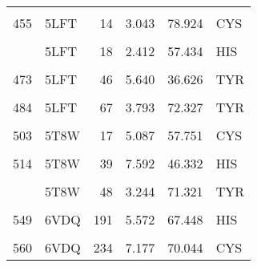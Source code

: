 \begin{table}
\begin{tabular}{llrrrl}
			\cellcolor{gray!6}{437} & \cellcolor{gray!6}{5KPF} & \cellcolor{gray!6}{67} & \cellcolor{gray!6}{3.864} & \cellcolor{gray!6}{73.698} & \cellcolor{gray!6}{TYR}\\
			455 & 5LFT & 14 & 3.043 & 78.924 & CYS\\
			\cellcolor{gray!6}{458} & \cellcolor{gray!6}{5LFT} & \cellcolor{gray!6}{17} & \cellcolor{gray!6}{5.110} & \cellcolor{gray!6}{55.965} & \cellcolor{gray!6}{CYS}\\
			\addlinespace
			459 & 5LFT & 18 & 2.412 & 57.434 & HIS\\
			\cellcolor{gray!6}{468} & \cellcolor{gray!6}{5LFT} & \cellcolor{gray!6}{39} & \cellcolor{gray!6}{7.158} & \cellcolor{gray!6}{48.215} & \cellcolor{gray!6}{HIS}\\
			473 & 5LFT & 46 & 5.640 & 36.626 & TYR\\
			\cellcolor{gray!6}{475} & \cellcolor{gray!6}{5LFT} & \cellcolor{gray!6}{48} & \cellcolor{gray!6}{3.281} & \cellcolor{gray!6}{71.142} & \cellcolor{gray!6}{TYR}\\
			484 & 5LFT & 67 & 3.793 & 72.327 & TYR\\
			\addlinespace
			\cellcolor{gray!6}{500} & \cellcolor{gray!6}{5T8W} & \cellcolor{gray!6}{14} & \cellcolor{gray!6}{3.051} & \cellcolor{gray!6}{80.130} & \cellcolor{gray!6}{CYS}\\
			503 & 5T8W & 17 & 5.087 & 57.751 & CYS\\
			\cellcolor{gray!6}{504} & \cellcolor{gray!6}{5T8W} & \cellcolor{gray!6}{18} & \cellcolor{gray!6}{2.411} & \cellcolor{gray!6}{56.673} & \cellcolor{gray!6}{HIS}\\
			514 & 5T8W & 39 & 7.592 & 46.332 & HIS\\
			\cellcolor{gray!6}{519} & \cellcolor{gray!6}{5T8W} & \cellcolor{gray!6}{46} & \cellcolor{gray!6}{5.687} & \cellcolor{gray!6}{36.358} & \cellcolor{gray!6}{TYR}\\
			\addlinespace
			521 & 5T8W & 48 & 3.244 & 71.321 & TYR\\
			\cellcolor{gray!6}{530} & \cellcolor{gray!6}{5T8W} & \cellcolor{gray!6}{67} & \cellcolor{gray!6}{3.632} & \cellcolor{gray!6}{72.392} & \cellcolor{gray!6}{TYR}\\
			549 & 6VDQ & 191 & 5.572 & 67.448 & HIS\\
			\cellcolor{gray!6}{556} & \cellcolor{gray!6}{6VDQ} & \cellcolor{gray!6}{201} & \cellcolor{gray!6}{10.385} & \cellcolor{gray!6}{69.466} & \cellcolor{gray!6}{CYS}\\
			560 & 6VDQ & 234 & 7.177 & 70.044 & CYS\\

\end{tabular}
\end{table}
